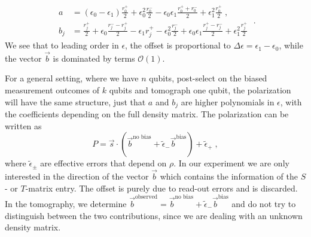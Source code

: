 \documentclass[two column]{article}
\begin{document}
\begin{equation}
\begin{aligned}
	a&=(\epsilon_0-\epsilon_1) \frac{r^+_0}{2} +\epsilon_0^2 \frac{r^-_0}{2} -\epsilon_0 \epsilon_1 \frac{r^+_0+r^-_0}{2} +\epsilon_1^2 \frac{r_0^+}{2}\;,\\
	b_j&=\frac{r^+_j}{2}+ \epsilon_0 \frac{r^-_j-r^+_j}{2} -\epsilon_1 r^+_j -\epsilon_0^2 \frac{r^-_j}{2} +\epsilon_0 \epsilon_1 \frac{r^+_j-r^-_j}{2} + \epsilon_1^2 \frac{r_j^+}{2}
	\end{aligned}\;.
\end{equation}
We see that to leading order in $\epsilon$, the offset is proportional to $\Delta \epsilon=\epsilon_1-\epsilon_0$, while the vector $\vec b$ is dominated by terms $\mathcal O(1)$.

For a general setting, where we have $n$ qubits, post-select on the biased measurement outcomes of $k$ qubits and tomograph one qubit, the polarization will have the same structure, just that $a$ and $b_j$ are higher polynomials in $\epsilon$, with the coefficients depending on the full density matrix. The polarization can be written as 
\begin{equation}
	P=\vec s \cdot (\vec b^\text{no bias} + \tilde{\epsilon}_- \vec b^\text{bias}) + \tilde \epsilon_+ \;,
\end{equation}
where $\tilde \epsilon_\pm$ are effective errors that depend on $\rho$. In our experiment we are only interested in the direction of the vector $\vec b$ which contains the information of the $S$- or $T$-matrix entry. The offset is purely due to read-out errors and is discarded. In the tomography, we determine $\vec b^\text{observed}=\vec b^\text{no bias} + \tilde{\epsilon}_- \vec b^\text{bias}$ and do not try to distinguish between the two contributions, since we are dealing with an unknown density matrix.
\end{document}
